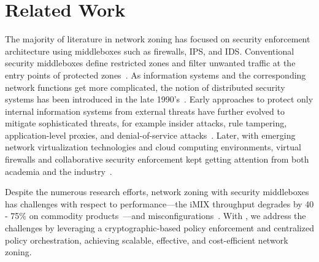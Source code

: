 \chapter{Related Work}
\label{related}

The majority of literature in network zoning has focused on security enforcement architecture using middleboxes such as firewalls, IPS, and IDS.
Conventional security middleboxes define restricted zones and filter unwanted traffic at the entry points of protected zones~\cite{cheswick1994firewalls}. 
As information systems and the corresponding network functions get more complicated, the notion of distributed security systems has been introduced in the late 1990's~\cite{bellovin1999distributed}.
Early approaches to protect only internal information systems from external threats have further evolved to mitigate sophisticated threats, for example insider attacks, rule tampering, application-level proxies, and denial-of-service attacks~\cite{markham2001security}.
Later, with emerging network virtualization technologies and cloud computing environments, virtual firewalls and collaborative security enforcement kept getting attention from both academia and the industry~\cite{liu2008collaborative,yu2017psi}. 

Despite the numerous research efforts, network zoning with security middleboxes has challenges with respect to performance---the iMIX throughput degrades by 40 - 75\% on commodity products~\cite{juniper2020comparison}---and misconfigurations~\cite{fayaz2016buzz,tschaen2016sfc,yuan2020netsmc}. 
With \name, we address the challenges by leveraging a cryptographic-based policy enforcement and centralized policy orchestration, achieving scalable, effective, and cost-efficient network zoning.


